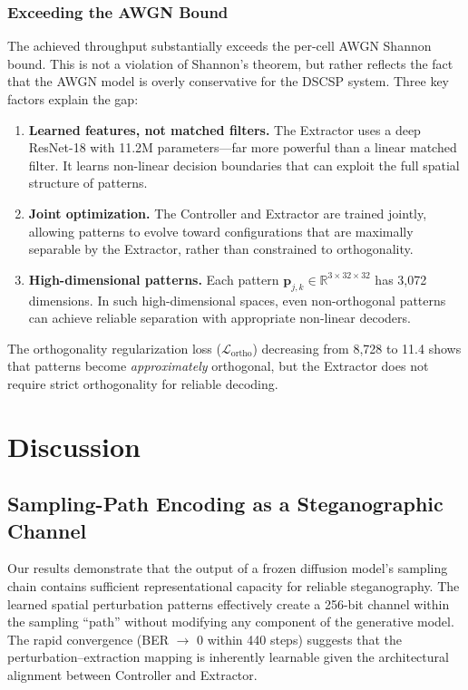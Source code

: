 \documentclass[conference]{IEEEtran}
\newcommand{\R}{\mathbb{R}}
\newcommand{\Lcal}{\mathcal{L}}
\begin{document}
\subsubsection{Exceeding the AWGN Bound}
The achieved throughput substantially exceeds the per-cell AWGN Shannon bound.
This is not a violation of Shannon's theorem, but rather reflects the fact that the AWGN model is overly conservative for the DSCSP system.
Three key factors explain the gap:
\begin{enumerate}[itemsep=1pt, topsep=2pt]
    \item \textbf{Learned features, not matched filters.} The Extractor uses a deep ResNet-18 with 11.2M parameters---far more powerful than a linear matched filter. It learns non-linear decision boundaries that can exploit the full spatial structure of patterns.
    \item \textbf{Joint optimization.} The Controller and Extractor are trained jointly, allowing patterns to evolve toward configurations that are maximally separable by the Extractor, rather than constrained to orthogonality.
    \item \textbf{High-dimensional patterns.} Each pattern $\mathbf{p}_{j,k} \in \R^{3 \times 32 \times 32}$ has 3{,}072 dimensions. In such high-dimensional spaces, even non-orthogonal patterns can achieve reliable separation with appropriate non-linear decoders.
\end{enumerate}

The orthogonality regularization loss ($\Lcal_\text{ortho}$) decreasing from 8{,}728 to 11.4 shows that patterns become \emph{approximately} orthogonal, but the Extractor does not require strict orthogonality for reliable decoding.


\section{Discussion}
\label{sec:discussion}

\subsection{Sampling-Path Encoding as a Steganographic Channel}
Our results demonstrate that the output of a frozen diffusion model's sampling chain contains sufficient representational capacity for reliable steganography.
The learned spatial perturbation patterns effectively create a 256-bit channel within the sampling ``path'' without modifying any component of the generative model.
The rapid convergence (BER $\to$ 0 within 440 steps) suggests that the perturbation--extraction mapping is inherently learnable given the architectural alignment between Controller and Extractor.
\end{document}
